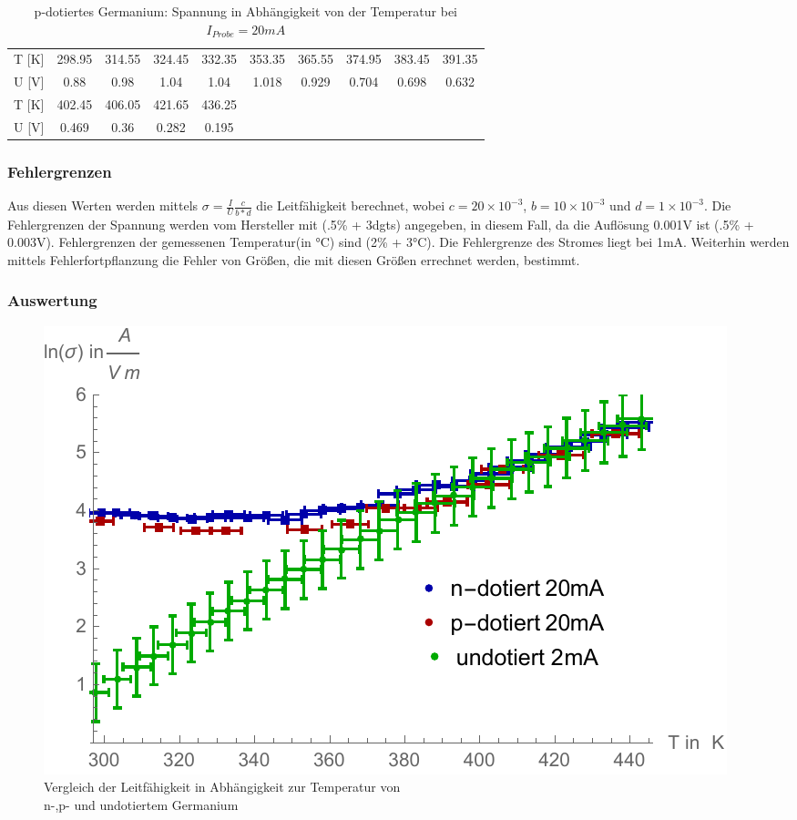 \begin{table}[H]
\centering
\begin{tabular}{|c||c|c|c|c|c|c|c|c|c|}
\hline
T [K] & 298.95 & 314.55 & 324.45 & 332.35 & 353.35 & 365.55 & 374.95 & 383.45 & 391.35 \\
 U [V] & 0.88 & 0.98 & 1.04 & 1.04 & 1.018 & 0.929 & 0.704 & 0.698 & 0.632 \\
 \hline
 T [K]& 402.45
   & 406.05 & 421.65 & 436.25 & & & & & \\
U [V] & 0.469 & 0.36 & 0.282
   & 0.195 & & & & & \\
 \hline
\end{tabular}
\caption{p-dotiertes Germanium: Spannung in Abhängigkeit von der Temperatur bei $I_{Probe}=20mA$}
\end{table} 

\subsubsection{Fehlergrenzen}
Aus diesen Werten werden mittels $\sigma=\frac{I}{U}\frac{c}{b *d}$ die Leitfähigkeit berechnet, wobei $c=20 \times 10^{-3}$, $b=10 \times 10^{-3}$ und $d=1 \times 10^{-3}$. Die Fehlergrenzen der Spannung werden vom Hersteller mit (.5\% + 3dgts) angegeben, in diesem Fall, da die Auflösung 0.001V ist (.5\% + 0.003V). Fehlergrenzen der gemessenen Temperatur(in °C) sind (2\% + 3°C). Die Fehlergrenze des Stromes liegt bei 1mA. Weiterhin werden mittels Fehlerfortpflanzung die Fehler von Größen, die mit diesen Größen errechnet werden, bestimmt.\\

\subsubsection{Auswertung}
\begin{figure}[H]
	\centering
\includegraphics[width=0.9\linewidth]{IMAGE/M2_all.pdf}
	\caption{Vergleich der Leitfähigkeit in Abhängigkeit zur Temperatur von\\ n-,p- und undotiertem Germanium}
	\label{fig:M2_1}
\end{figure} 

